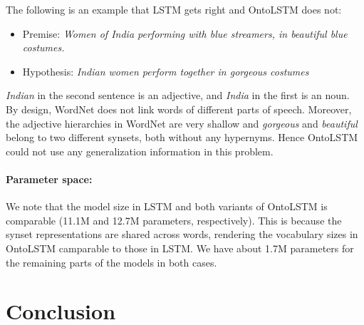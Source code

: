 The following is an example that LSTM gets right and OntoLSTM does not:
\begin{itemize}
 \item Premise: \textit{Women of India performing with blue streamers, in beautiful blue costumes.}
 \item Hypothesis: \textit{Indian women perform together in gorgeous costumes}
\end{itemize}
\textit{Indian} in the second sentence is an adjective, and \textit{India} in the first is an noun. By design, WordNet does not link words of different parts of speech. Moreover, the adjective hierarchies in WordNet are very shallow and \textit{gorgeous} and \textit{beautiful} belong to two different synsets, both without any hypernyms. Hence OntoLSTM could not use any generalization information in this problem.

\paragraph{Parameter space:} We note that the model size in LSTM and both variants of OntoLSTM is comparable (11.1M and 12.7M parameters, respectively). This is because the synset representations are shared across words, rendering the vocabulary sizes in OntoLSTM camparable to those in LSTM. We have about 1.7M parameters for the remaining parts of the models in both cases. 

\section{Conclusion}

